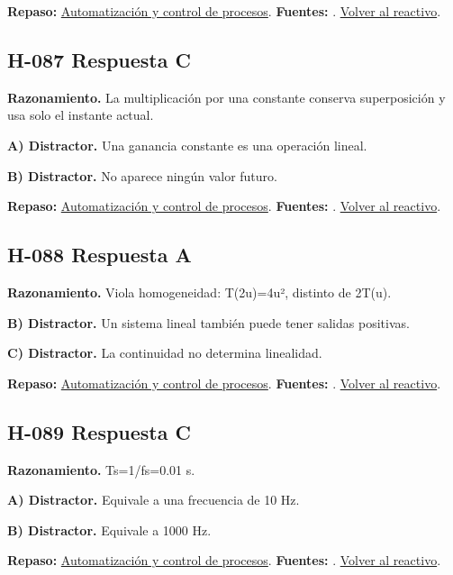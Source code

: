 \textbf{Repaso:} \hyperref[sec:h4]{Automatización y control de procesos}. \textbf{Fuentes:} \cite{control,signals,pid}. \hyperref[q:H-086]{Volver al reactivo}.\par\medskip

\subsection*{H-087 \quad Respuesta C}\label{s:H-087}
\textbf{Razonamiento.} La multiplicación por una constante conserva superposición y usa solo el instante actual.

\textbf{A) Distractor. }Una ganancia constante es una operación lineal.

\textbf{B) Distractor. }No aparece ningún valor futuro.

\textbf{Repaso:} \hyperref[sec:h4]{Automatización y control de procesos}. \textbf{Fuentes:} \cite{control,signals,pid}. \hyperref[q:H-087]{Volver al reactivo}.\par\medskip

\subsection*{H-088 \quad Respuesta A}\label{s:H-088}
\textbf{Razonamiento.} Viola homogeneidad: T(2u)=4u², distinto de 2T(u).

\textbf{B) Distractor. }Un sistema lineal también puede tener salidas positivas.

\textbf{C) Distractor. }La continuidad no determina linealidad.

\textbf{Repaso:} \hyperref[sec:h4]{Automatización y control de procesos}. \textbf{Fuentes:} \cite{control,signals,pid}. \hyperref[q:H-088]{Volver al reactivo}.\par\medskip

\subsection*{H-089 \quad Respuesta C}\label{s:H-089}
\textbf{Razonamiento.} Ts=1/fs=0.01 s.

\textbf{A) Distractor. }Equivale a una frecuencia de 10 Hz.

\textbf{B) Distractor. }Equivale a 1000 Hz.

\textbf{Repaso:} \hyperref[sec:h4]{Automatización y control de procesos}. \textbf{Fuentes:} \cite{control,signals,pid}. \hyperref[q:H-089]{Volver al reactivo}.\par\medskip


